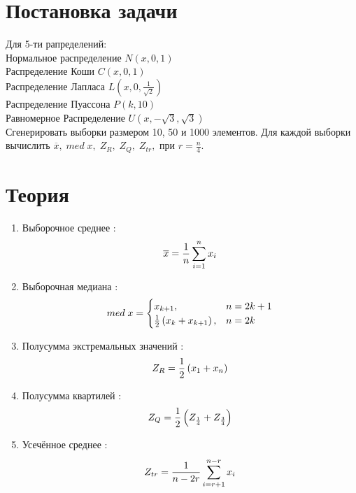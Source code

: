 \documentclass[a4]{article}
\begin{document}
	
	\newpage
	\tableofcontents{}
	\newpage
	\listoftables
	\newpage
	
	
	\section{Постановка задачи}
	
	Для 5-ти рапределений:\\
		Нормальное распределение $N(x,0,1)$\\
		Распределение Коши $C(x,0,1)$\\
		Распределение Лапласа $L( x,0,\frac{1}{\sqrt{2}})$\\
		Распределение Пуассона $P(k, 10)$\\
		Равномерное Распределение $U(x,-\sqrt{3}, \sqrt{3})$\\
		
		Сгенерировать выборки размером 10, 50 и 1000 элементов.
		Для каждой выборки вычислить $\overline{x},\; med\; x,\; Z_R,\; Z_Q,\; Z_{tr},$ при $r = \frac{n}{4}$.
		
	
	\section{Теория}
		\begin{enumerate}
			\item Выборочное среднее \cite{average}:
			\begin{equation}\label{eqn:average}
			\overline{x} = \frac{1}{n}\sum_{i=1}^n x_i \hfill  
			\end{equation}
			\item Выборочная медиана \cite{med}:
			\begin{equation}
			med\; x = \begin{cases}
			x_{k+1}, & n = 2k+1\\
			\frac{1}{2}\left(x_k+x_{k+1}\right), & n = 2k
			\end{cases} \hfill  \label{eqn:med}
			\end{equation}
			\item Полусумма экстремальных значений \cite{mean_extr}:
			\begin{equation}
			Z_R = \frac{1}{2}\left(x_1+x_n\right) \hfill  \label{eqn:mean_extr}
			\end{equation}
			\item Полусумма квартилей \cite{quartiles}:
			\begin{equation}
			Z_Q = \frac{1}{2}\left(Z_{\frac{1}{4}}+Z_{\frac{3}{4}}\right) \hfill  \label{eqn:quartiles}
			\end{equation}
			\item Усечённое среднее \cite{cut_mean}:
			\begin{equation}
			Z_{tr} = \frac{1}{n - 2r}\sum_{i=r+1}^{n-r} x_i \hfill  \label{eqn:cut_mean}
			\end{equation}
		\end{enumerate}	
		
\end{document}
